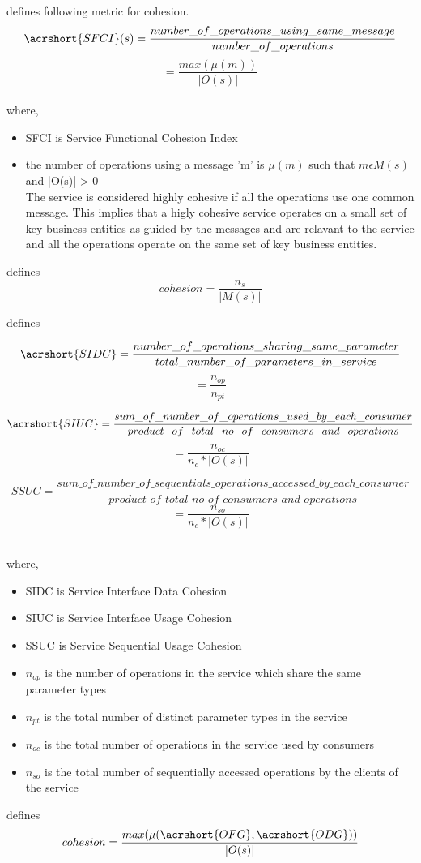 {{{\cite{Sindhgatta:2015aa} defines following metric for cohesion.
$$ \acrshort{SFCI}(s) = \frac{number\_of\_operations\_using\_same\_message}{number\_of\_operations} $$ $$ = \frac{max (\mu(m) )}{|O(s)|} $$
\\
where,
\begin{itemize}[leftmargin=.5in]
\item SFCI is Service Functional Cohesion Index
\item the number of operations using a message 'm'  is $\mu(m)$ such that $ m \epsilon M(s) $ and |O(s)| > 0
\\The service is considered highly cohesive if all the operations use one common message. This implies that a higly cohesive  service operates on a small set of key business entities as guided by the messages and are  relavant to the service and all the operations operate on the same set of key business entities. \cite{Sindhgatta:2015aa}
\end{itemize}

\cite{Bingu-Shim:2008aa} defines
$$ cohesion =  \frac{n_s}{|M(s)|}$$

\cite{Perepletchikov:2007aa} defines

$$ \acrshort{SIDC} = \frac{number\_of\_operations\_sharing\_same\_parameter}{total\_number\_of\_parameters\_in\_service} $$ $$ = \frac{ n_{op} }{n_{pt}} $$

$$ \acrshort{SIUC} = \frac{sum\_of\_number\_of\_operations\_used\_by\_each\_consumer}{product\_of\_total\_no\_of\_consumers\_and\_operations} $$ $$= \frac{n_{oc}}{n_c * |O(s)|}$$

$$ SSUC = \frac{sum\_of\_number\_of\_sequentials\_operations\_accessed\_by\_each\_consumer}{product\_of\_total\_no\_of\_consumers\_and\_operations} $$ $$=\frac{n_{so}}{n_c * |O(s)|}$$

\\where,
\begin{itemize}[leftmargin=.5in]
\item SIDC is Service Interface Data Cohesion
\item SIUC is Service Interface Usage Cohesion
\item SSUC is Service Sequential Usage Cohesion
\item $n_{op}$ is the number of operations in the service which share the same parameter types
\item $n_{pt}$ is the total number of distinct parameter types in the service
\item $n_{oc}$ is the total number of operations in the service used by consumers
\item $n_{so}$ is the total number of sequentially accessed operations by the clients of the service
\end{itemize}
\cite{Saad-Alahmari:2011aa} defines
$$ cohesion = \frac{max(\mu(\acrshort{OFG}, \acrshort{ODG}))}{|O(s)|} $$

}}}

